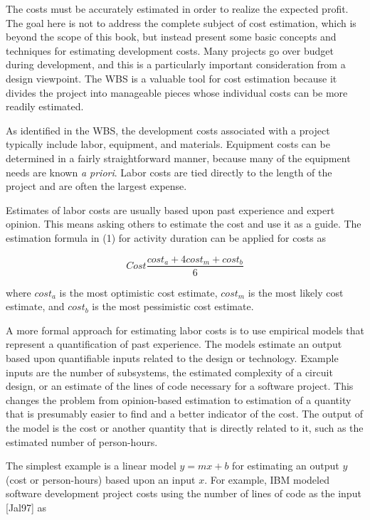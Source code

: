 The costs must be accurately estimated in order to realize the expected
profit. The goal here is not to address the complete subject of cost
estimation, which is beyond the scope of this book, but instead present
some basic concepts and techniques for estimating development costs.
Many projects go over budget during development, and this is a
particularly important consideration from a design viewpoint. The WBS is
a valuable tool for cost estimation because it divides the project into
manageable pieces whose individual costs can be more readily estimated.

As identified in the WBS, the development costs associated with a
project typically include labor, equipment, and materials. Equipment
costs can be determined in a fairly straightforward manner, because many
of the equipment needs are known \emph{a priori}. Labor costs are tied
directly to the length of the project and are often the largest expense.

Estimates of labor costs are usually based upon past experience and
expert opinion. This means asking others to estimate the cost and use it
as a guide. The estimation formula in (1) for activity duration can be
applied for costs as

\begin{equation}
\label{equ:integralDeltaSliceOfPDF}
Cost \frac{cost_a +4 cost_m + cost_b}{6}
\end{equation}

where $cost_a$ is the most optimistic
cost estimate, $cost_m$ is the most
likely cost estimate, and $cost_b$ is the
most pessimistic cost estimate.

A more formal approach for estimating labor costs is to use empirical
models that represent a quantification of past experience. The models
estimate an output based upon quantifiable inputs related to the design
or technology. Example inputs are the number of subsystems, the
estimated complexity of a circuit design, or an estimate of the lines of
code necessary for a software project. This changes the problem from
opinion-based estimation to estimation of a quantity that is presumably
easier to find and a better indicator of the cost. The output of the
model is the cost or another quantity that is directly related to it,
such as the estimated number of person-hours.

The simplest example is a linear model $y=mx+b$ for estimating an
output $y$ (cost or person-hours) based upon an input $x$. For
example, IBM modeled software development project costs using the number
of lines of code as the input {[}Jal97{]} as

